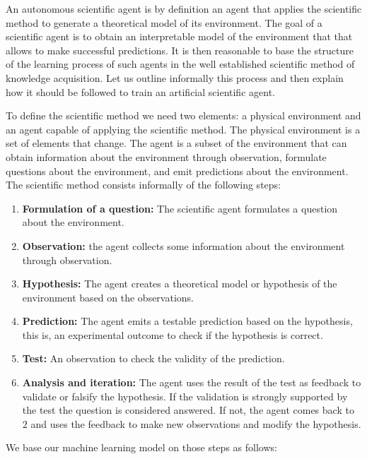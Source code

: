 \documentclass[11pt,a4paper,twoside]{report}
\newcommand{\+}{\textnormal{+} }
\theoremstyle{definition}
\numberwithin{equation}{chapter}
\begin{document}
An autonomous scientific agent is by definition an agent that applies the
scientific method to generate a theoretical model of its environment. The goal
of a scientific agent is to obtain an interpretable model of the environment
that that allows to make successful predictions. It is then reasonable to base
the structure of the learning process of such agents in the well established
scientific method of knowledge acquisition. Let us outline informally this
process and then explain how it should be followed to train an artificial
scientific agent.

\par To define the scientific method we need two elements: a physical
environment and an agent capable of applying the scientific method. The physical
environment is a set of elements that change. The agent is a subset of the
environment that can obtain information about the environment through
observation, formulate questions about the environment, and emit
predictions about the environment. The scientific method consists
informally of the following steps:
\begin{enumerate}
  \item \textbf{Formulation of a question:} The scientific agent formulates a
  question about the environment.
  \item \textbf{Observation:} the agent collects some information about the
  environment through observation.
  \item  \textbf{Hypothesis:} The agent creates a theoretical model or
  hypothesis of the environment based on the observations.
  \item \textbf{Prediction:} The agent emits a testable prediction based on the
  hypothesis, this is, an experimental outcome to check if the hypothesis is
  correct.
  \item \textbf{Test:} An observation to check the validity of the 
  prediction.
  \item \textbf{Analysis and iteration:} The agent uses the result of the test
  as feedback to validate or falsify the hypothesis. If the validation is 
  strongly supported by the test the question is considered answered. 
  If not, the agent comes back to $2$ and uses the feedback to make new
  observations and modify the hypothesis.
\end{enumerate}

We base our machine learning model on those steps as follows:
\end{document}
